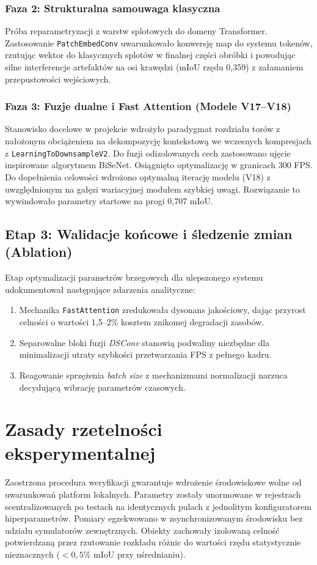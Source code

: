 \subsubsection{Faza 2: Strukturalna samouwaga klasyczna}
Próba reparametryzacji z warstw splotowych do domeny Transformer. Zastosowanie \texttt{PatchEmbedConv} uwarunkowało konwersję map do systemu tokenów, rzutując wektor do klasycznych splotów w finalnej części obróbki i powodując silne interferencje artefaktów na osi krawędzi (mIoU rzędu 0,359) z załamaniem przepustowości wejściowych.

\subsubsection{Faza 3: Fuzje dualne i Fast Attention (Modele V17--V18)}
Stanowisko docelowe w projekcie wdrożyło paradygmat rozdziału torów z nałożonym obciążeniem na dekompozycję kontekstową we wczesnych kompresjach z \texttt{LearningToDownsampleV2}. Do fuzji odizolowanych cech zastosowano ujęcie inspirowane algorytmem BiSeNet. Osiągnięto optymalizację w granicach 300 FPS. Do dopełnienia celowości wdrożono optymalną iterację modelu (V18) z uwzględnionym na gałęzi wariacyjnej modułem szybkiej uwagi. Rozwiązanie to wywindowało parametry startowe na progi 0,707 mIoU.

\subsection{Etap 3: Walidacje końcowe i śledzenie zmian (Ablation)}
Etap optymalizacji parametrów brzegowych dla ulepszonego systemu udokumentował następujące zdarzenia analityczne:
\begin{enumerate}
    \item Mechanika \texttt{FastAttention} zredukowała dysonans jakościowy, dając przyrost celności o wartości 1,5--2\% kosztem znikomej degradacji zasobów.
    \item Separowalne bloki fuzji \textit{DSConv} stanowią podwaliny niezbędne dla minimalizacji utraty szybkości przetwarzania FPS z pełnego kadru.
    \item Reagowanie sprzężenia \textit{batch size} z mechanizmami normalizacji narzuca decydującą wibrację parametrów czasowych.
\end{enumerate}

\section{Zasady rzetelności eksperymentalnej}
Zaostrzona procedura weryfikacji gwarantuje wdrożenie środowiskowe wolne od uwarunkowań platform lokalnych. Parametry zostały unormowane w rejestrach scentralizowanych po testach na identycznych pulach z jednolitym konfiguratorem hiperparametrów. Pomiary egzekwowano w zsynchronizowanym środowisku bez udziału symulatorów zewnętrznych. Obiekty zachowały izolowaną celność potwierdzaną przez rzutowanie rozkładu różnic do wartości rzędu statystycznie nieznacznych ($< 0,5\%$ mIoU przy uśrednianiu).
